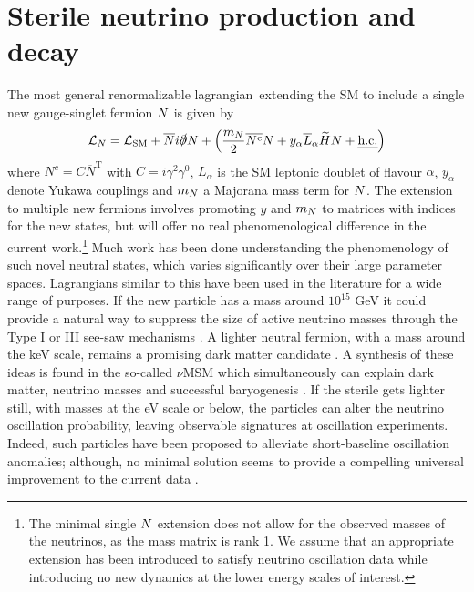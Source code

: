 \documentclass[11pt, a4paper]{article}
\def\lagrangian{lagrangian}
\def\ster{\ensuremath N}
\begin{document}
\section{\label{sec:decays}Sterile neutrino production and decay}

The most general renormalizable \lagrangian\ extending the SM to include a
single new gauge-singlet fermion $\ster$ is given by
%
\begin{align}   \mathcal{L}_N = \mathcal{L}_\text{SM} +
\overline{\ster}i\slashed{\partial}\ster + \left(\frac{m_\ster}{2}
\overline{\ster^\text{c}}\ster  + y_\alpha\overline{L}_\alpha\widetilde{H}
\ster + \text{\emph{h.c.}}\right)\label{eq:minimallag} \end{align}
%
where $N^c=C\overline{N}^\text{T}$ with $C=i\gamma^2\gamma^0$, $L_\alpha$ is
the SM leptonic doublet of flavour $\alpha$, $y_\alpha$ denote Yukawa couplings
and $m_\ster$ a Majorana mass term for $\ster$. The extension to multiple new
fermions involves promoting $y$ and $m_\ster$ to matrices with indices for the new
states, but will offer no real phenomenological difference in the current
work.\footnote{The minimal single $\ster$ extension does not allow for the
observed masses of the neutrinos, as the mass matrix is rank 1. We assume that
an appropriate extension has been introduced to satisfy neutrino oscillation
data while introducing no new dynamics at the lower energy scales of interest.}
Much work has been done understanding the phenomenology of such novel neutral
states, which varies significantly over their large parameter spaces. 
%
Lagrangians similar to this have been used in the literature for a wide range
of purposes. If the new particle has a mass around $10^{15}$ GeV it could
provide a natural way to suppress the size of active neutrino masses through
the Type I or III see-saw mechanisms \cite{Minkowski:1977sc, GellMann:1980vs,
Mohapatra:1979ia}. A lighter neutral fermion, with a mass around the keV scale,
remains a promising dark matter candidate \cite{Adhikari:2016bei}. A synthesis
of these ideas is found in the so-called $\nu$MSM which simultaneously can
explain dark matter, neutrino masses and successful baryogenesis
\cite{Asaka:2005pn}. 
%
If the sterile gets lighter still, with masses at the eV scale or below, the
particles can alter the neutrino oscillation probability, leaving observable
signatures at oscillation experiments. Indeed, such particles have been
proposed to alleviate short-baseline oscillation anomalies; although, no
minimal solution seems to provide a compelling universal improvement to the
current data \cite{Kopp:2013vaa,Conrad:2012qt}.
\end{document}
